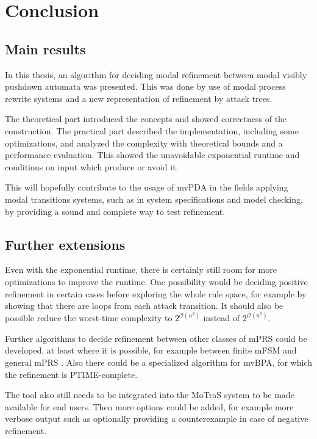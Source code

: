 \chapter{Conclusion}

\section{Main results}

In this thesis, an algorithm for deciding modal refinement
between modal visibly pushdown automata was presented.
This was done by use of modal process rewrite systems
and a new representation of refinement by attack trees.

The theoretical part introduced the concepts and showed
correctness of the construction.
The practical part described the implementation,
including some optimizations, and analyzed the
complexity with theoretical bounds and a performance evaluation.
This showed the unavoidable exponential runtime and
conditions on input which produce or avoid it.

This will hopefully contribute to the usage of mvPDA
in the fields applying modal transitions systems, such as in
system specifications and model checking, by providing
a sound and complete way to test refinement.

\section{Further extensions}

Even with the exponential runtime, there is certainly
still room for more optimizations to improve the runtime.
One possibility would be deciding positive refinement in certain cases before
exploring the whole rule space, for example by showing that there are
loops from each attack transition.
It should also be possible reduce the worst-time complexity
to $2^{\mathcal O(n^2)}$ instead of $2^{\mathcal O(n^6)}$.

Further algorithms to decide 
refinement between other classes of mPRS could be developed,
at least where it is possible, for example
between finite mFSM and general mPRS \cite{BenesK12}. Also there could be a
specialized algorithm for mvBPA, for which the refinement is PTIME-complete.

The tool also still needs to be integrated into the MoTraS system to be made
available for end users. Then more options could be added, for example
more verbose output such as optionally providing a counterexample
in case of negative refinement.


